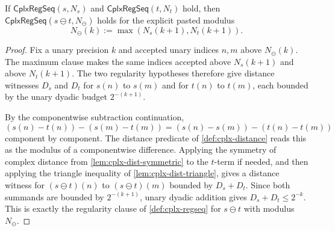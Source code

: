 \begin{lemma}
\label{lem:cplx-difference-regular}
If $\mathsf{CplxRegSeq}(s,N_s)$ and $\mathsf{CplxRegSeq}(t,N_t)$ hold, then $\mathsf{CplxRegSeq}(s\ominus t,N_{\ominus})$ holds for the explicit pasted modulus
$$
N_{\ominus}(k):=\max(N_s(k+1),N_t(k+1)).
$$
\end{lemma}
\begin{proof}
Fix a unary precision $k$ and accepted unary indices $n,m$ above $N_{\ominus}(k)$. The maximum clause makes the same indices accepted above $N_s(k+1)$ and above $N_t(k+1)$. The two regularity hypotheses therefore give distance witnesses $D_s$ and $D_t$ for $s(n)$ to $s(m)$ and for $t(n)$ to $t(m)$, each bounded by the unary dyadic budget $2^{-(k+1)}$.

By the componentwise subtraction continuation,
$$
(s(n)-t(n))-(s(m)-t(m))=(s(n)-s(m))-(t(n)-t(m))
$$
component by component. The distance predicate of \autoref{def:cplx-distance} reads this as the modulus of a componentwise difference. Applying the symmetry of complex distance from \autoref{lem:cplx-dist-symmetric} to the $t$-term if needed, and then applying the triangle inequality of \autoref{lem:cplx-dist-triangle}, gives a distance witness for $(s\ominus t)(n)$ to $(s\ominus t)(m)$ bounded by $D_s+D_t$. Since both summands are bounded by $2^{-(k+1)}$, unary dyadic addition gives $D_s+D_t\leq 2^{-k}$. This is exactly the regularity clause of \autoref{def:cplx-regseq} for $s\ominus t$ with modulus $N_{\ominus}$.
\end{proof}

